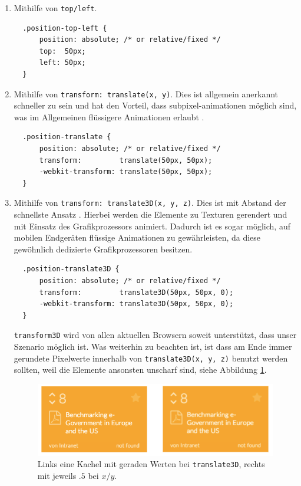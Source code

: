 \documentclass[12pt,twoside]{book}
\begin{document}
\begin{enumerate}
  \item Mithilfe von \texttt{top/left}.\\
  \begin{verbatim}
  .position-top-left {
      position: absolute; /* or relative/fixed */
      top:  50px;
      left: 50px;
  }
  \end{verbatim}
  \item Mithilfe von \texttt{transform: translate(x, y)}. Dies ist allgemein anerkannt schneller zu sein und hat den Vorteil, dass subpixel-animationen möglich sind, was im Allgemeinen flüssigere Animationen erlaubt \cite{translate}. \\
  \begin{verbatim}
  .position-translate {
      position: absolute; /* or relative/fixed */
      transform:         translate(50px, 50px);
      -webkit-transform: translate(50px, 50px);
  }
  \end{verbatim}
  \item Mithilfe von \texttt{transform: translate3D(x, y, z)}. Dies ist mit Abstand der schnellste Ansatz \cite{translate3dvstranslate}. Hierbei werden die Elemente zu Texturen gerendert und mit Einsatz des Grafikprozessors animiert. Dadurch ist es sogar möglich, auf mobilen Endgeräten flüssige Animationen zu gewährleisten, da diese gewöhnlich dedizierte Grafikprozessoren besitzen.
  \begin{verbatim}
  .position-translate3D {
      position: absolute; /* or relative/fixed */
      transform:         translate3D(50px, 50px, 0);
      -webkit-transform: translate3D(50px, 50px, 0);
  }
  \end{verbatim}
  \texttt{transform3D} wird von allen aktuellen Browsern soweit unterstützt, dass unser Szenario möglich ist\cite{transform3d}. Was weiterhin zu beachten ist, ist dass am Ende immer gerundete Pixelwerte innerhalb von \texttt{translate3D(x, y, z)} benutzt werden sollten, weil die Elemente ansonsten unscharf sind, siehe Abbildung \ref{fig:blurry}.

\begin{figure}[htbp]
	\centering
	\includegraphics[width=1.0\textwidth]{images/blurry_tiles.png}
	\caption{Links eine Kachel mit geraden Werten bei \texttt{translate3D}, rechts mit jeweils $.5$ bei $x/y$.}
	\label{fig:blurry}
\end{figure}

\end{enumerate}
\end{document}
